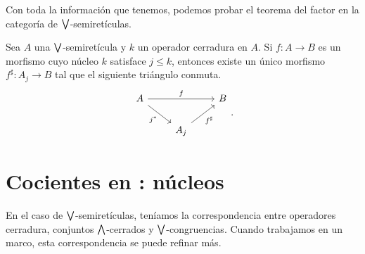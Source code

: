Con toda la información que tenemos,
podemos probar el teorema del factor
en la categoría de $\bigvee$-semiretículas.
\begin{thm}
    Sea $A$ una $\bigvee$-semiretícula y $k$ un operador cerradura en $A$.
    Si $f:A\to B$ es un morfismo cuyo núcleo $k$ satisface $j\leq k$,
    entonces existe un único morfismo $f^\sharp:A_j\to B$ tal que
    el siguiente triángulo conmuta.
    \[
        \begin{tikzcd}
            A \ar[rr,"f"] \ar[dr,"j^*"'] &&  B \\
            &A_j \ar[ur,"f^\sharp"']
        \end{tikzcd}
    .\]
\end{thm}
    

\section{Cocientes en : núcleos}
En el caso de $\bigvee$-semiretículas, teníamos la correspondencia
entre operadores cerradura, conjuntos $\bigwedge$-cerrados
y $\bigvee$-congruencias.
Cuando trabajamos en un marco, esta correspondencia se puede refinar
más.

